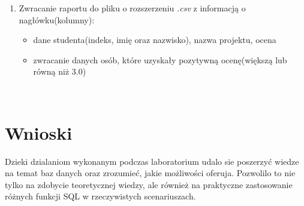 \documentclass[a4paper, 10pt]{article}
\begin{document}
\begin{enumerate}
\begin{itemize}
		\end{itemize}
		\begin{lstlisting}[style=SQL, caption=\textit{Tworzenie widoków}]
		\end{lstlisting}
	\item Zwracanie raportu do pliku o rozszerzeniu \emph{.csv} z informacją o nagłówku(kolumny):
		\begin{itemize}
			\item dane studenta(indeks, imię oraz nazwisko), nazwa projektu, ocena
			\item zwracanie danych osób, które uzyskały pozytywną ocenę(większą lub równą niż 3.0)
		\end{itemize}
		\begin{lstlisting}[style=SQL, caption=\textit{Zwracanie raportu do pliku}]
		
		\end{lstlisting}
\end{enumerate}

\section{Wnioski}

Dzieki dzialaniom wykonanym podczas laboratorium udalo sie poszerzyć wiedze na temat baz danych oraz zrozumieć, jakie możliwości oferuja. Pozwolilo to nie tylko na zdobycie teoretycznej wiedzy, ale również na praktyczne zastosowanie różnych funkcji SQL w rzeczywistych scenariuszach.
\end{document}
